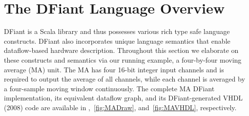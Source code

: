 \section{The DFiant Language Overview}
\label{sec:dfiant}
DFiant is a Scala library and thus possesses various rich type safe language constructs. DFiant also incorporates unique language semantics that enable dataflow-based hardware description. Throughout this section we elaborate on these constructs and semantics via our running example, a four-by-four moving average (MA) unit. The MA has four 16-bit integer input channels and is required to output the average of all channels, while each channel is averaged by a four-sample moving window continuously. The complete MA DFiant implementation, its equivalent dataflow graph, and its DFiant-generated VHDL (2008) code are available in ,~\ref{fig:MADraw}, and~\ref{fig:MAVHDL}, respectively.


